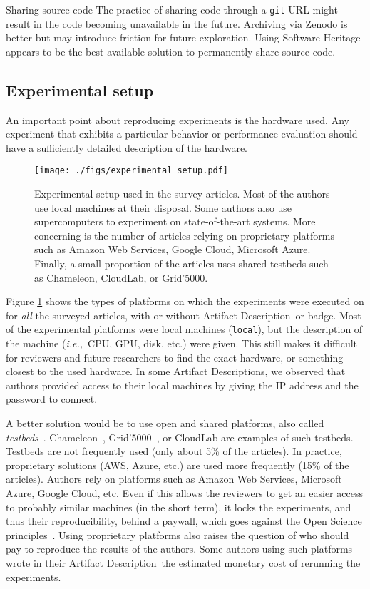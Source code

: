 \documentclass[sigconf,natbib=false]{acmart}
\newcommand{\ie}{\emph{i.e.,}}
\newcommand{\ad}{Artifact Description}
\begin{document}
\begin{lesson}{Sharing source code}{}
  The practice of sharing code through a \texttt{git} URL might result in the code becoming unavailable in the future.
  Archiving via Zenodo is better but may introduce friction for future exploration.
  Using Software-Heritage appears to be the best available solution to permanently share source code.
\end{lesson}

\subsection{Experimental setup}\label{sec:sop:expe}

An important point about reproducing experiments is the hardware used.
Any experiment that exhibits a particular behavior or performance evaluation should have a sufficiently detailed description of the hardware. 

\begin{figure}
  \centering
  \texttt{[image: ./figs/experimental\_setup.pdf]}
  \caption{Experimental setup used in the survey articles.
  Most of the authors use local machines at their disposal.
  Some authors also use supercomputers to experiment on state-of-the-art systems.
  More concerning is the number of articles relying on proprietary platforms such as Amazon Web Services, Google Cloud, Microsoft Azure.
  Finally, a small proportion of the articles uses shared testbeds such as Chameleon, CloudLab, or Grid'5000.}\label{fig:experimental_setup}
\end{figure}

Figure \ref{fig:experimental_setup} shows the types of platforms on which the experiments were executed on for \emph{all} the surveyed articles, with or without \ad\ or badge.
Most of the experimental platforms were local machines (\texttt{local}), but the description of the machine (\ie\ CPU, GPU, disk, etc.) were given.
This still makes it difficult for reviewers and future researchers to find the exact hardware, or something closest to the used hardware.
In some \ad s, we observed that authors provided access to their local machines by giving the IP address and the password to connect.

A better solution would be to use open and shared platforms, also called \emph{testbeds}\ \cite{nussbaum2017testbeds}.
Chameleon\ \cite{chameleon}, Grid'5000\ \cite{grid5000}, or CloudLab \cite{cloudlab} are examples of such testbeds.
Testbeds are not frequently used (only about 5\% of the articles).
In practice, proprietary solutions (AWS, Azure, etc.) are used more frequently (15\% of the articles).
Authors rely on platforms such as Amazon Web Services, Microsoft Azure, Google Cloud, etc.
Even if this allows the reviewers to get an easier access to probably similar machines (in the short term), it locks the experiments, and thus their reproducibility, behind a paywall, which goes against the Open Science principles\ \cite{openscience_unesco}.
Using proprietary platforms also raises the question of who should pay to reproduce the results of the authors.
Some authors using such platforms wrote in their \ad\ the estimated monetary cost of rerunning the experiments.
\end{document}
